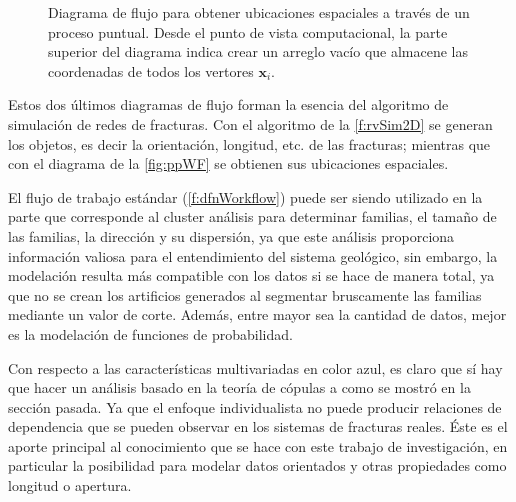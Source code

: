 \begin{figure}[H]
\begin{center}
\end{center}
\caption{Diagrama de flujo para obtener ubicaciones espaciales a trav\'es de un proceso puntual. Desde el punto de vista computacional,  la parte superior del diagrama indica crear un arreglo vac\'io que almacene las coordenadas de todos los vertores $\mathbf{x}_i$.}
\label{fig:ppWF}
\end{figure}

Estos dos \'ultimos diagramas de flujo forman la esencia del algoritmo de simulaci\'on de redes de fracturas. Con el algoritmo de la \autoref{f:rvSim2D} se generan los objetos, es decir la orientaci\'on, longitud, etc. de las fracturas; mientras que con el diagrama de la \autoref{fig:ppWF} se obtienen sus ubicaciones espaciales.

El flujo de trabajo est\'andar (\autoref{f:dfnWorkflow}) puede ser siendo utilizado en la parte que corresponde al cluster an\'alisis para determinar familias, el tama\~no de las familias, la direcci\'on y su dispersi\'on, ya que este an\'alisis proporciona informaci\'on valiosa para el entendimiento del sistema geol\'ogico, sin embargo, la modelaci\'on resulta m\'as compatible con los datos si se hace de manera total, ya que no se crean los artificios generados al segmentar bruscamente las familias mediante un valor de corte. Adem\'as, entre mayor sea la cantidad de datos, mejor es la modelaci\'on de funciones de probabilidad.

Con respecto a las caracter\'isticas multivariadas en color azul, es claro que s\'i hay que hacer un an\'alisis basado en la teor\'ia de c\'opulas a como se mostr\'o en la secci\'on pasada. Ya que el enfoque individualista no puede producir relaciones de dependencia que se pueden observar en los sistemas de fracturas reales. \'Este es el aporte principal al conocimiento que se hace con este trabajo de investigaci\'on, en particular la posibilidad para modelar datos orientados y otras propiedades como longitud o apertura.

